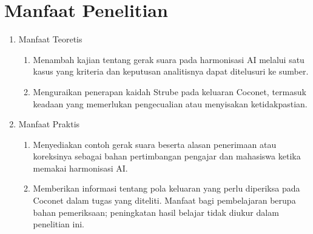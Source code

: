 \section{Manfaat Penelitian}\label{sec:manfaat-penelitian}

\begin{enumerate}
    \renewcommand{\labelenumii}{\alph{enumii}.}
    \item Manfaat Teoretis
    \begin{enumerate}
        \item Menambah kajian tentang gerak suara pada harmonisasi AI melalui satu kasus yang kriteria dan keputusan analitisnya dapat ditelusuri ke sumber.
        \item Menguraikan penerapan kaidah Strube pada keluaran Coconet, termasuk keadaan yang memerlukan pengecualian atau menyisakan ketidakpastian.
    \end{enumerate}
    \item Manfaat Praktis
    \begin{enumerate}
        \item Menyediakan contoh gerak suara beserta alasan penerimaan atau koreksinya sebagai bahan pertimbangan pengajar dan mahasiswa ketika memakai harmonisasi AI.
        \item Memberikan informasi tentang pola keluaran yang perlu diperiksa pada Coconet dalam tugas yang diteliti. Manfaat bagi pembelajaran berupa bahan pemeriksaan; peningkatan hasil belajar tidak diukur dalam penelitian ini.
    \end{enumerate}
\end{enumerate}
